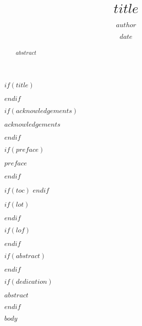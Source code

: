 \documentclass[12pt,twoside]{reedthesis}
\title{$title$}
\author{$author$}
\date{$date$}
\begin{document}
  $if(title)$
    \maketitle
  $endif$

  \frontmatter %
  \pagestyle{empty} %

  $if(acknowledgements)$
    \begin{acknowledgements}
      $acknowledgements$
    \end{acknowledgements}
  $endif$

  $if(preface)$
    \begin{preface}
      $preface$
    \end{preface}
  $endif$


  $if(toc)$
  {
    \hypersetup{linkcolor=$if(toccolor)$$toccolor$$else$black$endif$}
    \setcounter{tocdepth}{$toc-depth$}
    \tableofcontents
  }
  $endif$

  $if(lot)$
    \listoftables
  $endif$

  $if(lof)$
    \listoffigures
  $endif$

  $if(abstract)$
    \begin{abstract}
      $abstract$
    \end{abstract}
  $endif$

  $if(dedication)$
    \begin{dedication}
      $abstract$
    \end{dedication}
  $endif$


  \mainmatter %
  \pagestyle{fancyplain} %

  $body$

\printbibliography

\end{document}
